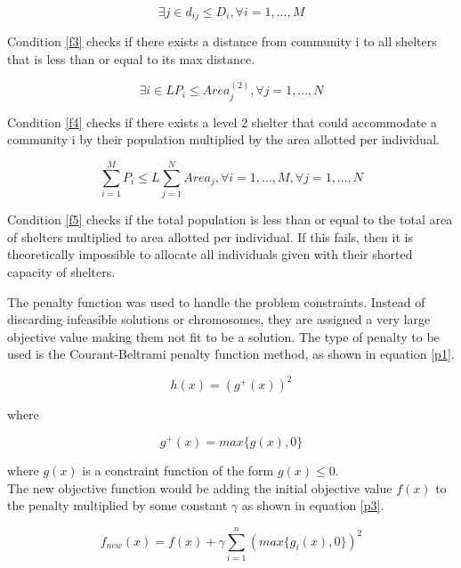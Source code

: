 \documentclass[12pt,a4paper,]{article}
\begin{document}
	\begin{equation} 
		\label{f3}
		\exists j \in d_{ij} \le D_{i}, \forall i = 1, ..., M
	\end{equation}
	
	Condition \ref{f3} checks if there exists a distance from community i to all shelters that is less than or equal to its max distance.
	
	\begin{equation} 
		\label{f4}
		\exists i \in LP_{i} \le Area_{j}^{(2)}, \forall j = 1, ..., N
	\end{equation}
	
	Condition \ref{f4} checks if there exists a level 2 shelter that could accommodate a community i by their population multiplied by the area allotted per individual. 
	
	\begin{equation} 
		\label{f5}
		\sum_{i=1}^{M}P_{i} \le L\sum_{j=1}^{N}Area_{j}, \forall i=1,...,M,  \forall j=1,...,N
	\end{equation}
	
	Condition \ref{f5} checks if the total population is less than or equal to the total area of shelters multiplied to area allotted per individual. If this fails, then it is theoretically impossible to allocate all individuals given with their shorted capacity of shelters.
	
	The penalty function was used to handle the problem constraints. Instead of discarding infeasible solutions or chromosomes, they are assigned a very large objective value making them not fit to be a solution. The type of penalty to be used is the Courant-Beltrami penalty function method, as shown in equation \ref{p1}.
	
	\begin{equation} 
		\label{p1}
		h(x)=(g^+(x))^2
	\end{equation}
	
	where
	
	\begin{equation} 
		\label{p2}
		g^+(x)=max\{g(x),0\}
	\end{equation}
	
	where $g(x)$ is a constraint function of the form $g(x)\le0$. 
	\\
	The new objective function would be adding the initial objective value $f(x)$ to the penalty multiplied by some constant $\gamma$ as shown in equation \ref{p3}.
	
	\begin{equation} 
		\label{p3}
		f_{new}(x)=f(x)+\gamma\sum_{i=1}^{n}(max\{g_i(x),0\})^2
	\end{equation}
	
\end{document}
